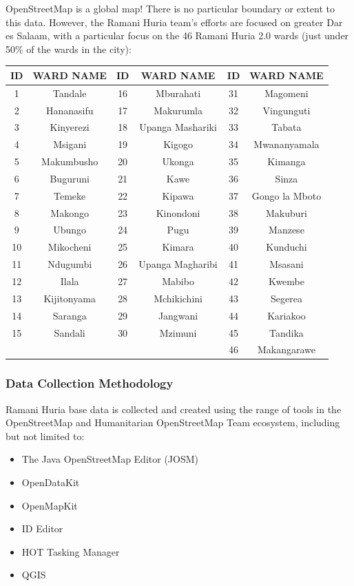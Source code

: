 \documentclass[a4paper,12pt,twoside]{article}
\begin{document}
OpenStreetMap is a global map! There is no particular boundary or extent to this data. However, the Ramani Huria team's efforts are focused on greater Dar es Salaam, with a particular focus on the 46 Ramani Huria 2.0 wards (just under 50\% of the wards in the city):

\begin{center}
\begin{tabular}{|c|c|c|c|c|c|}
\hline
ID & WARD NAME & ID & WARD NAME & ID & WARD NAME\\
\hline
1 & Tandale & 16 & Mburahati & 31 & Magomeni\\
2 & Hananasifu & 17 & Makurumla & 32 & Vingunguti\\
3 & Kinyerezi & 18 & Upanga Mashariki & 33 & Tabata\\
4 & Msigani & 19 & Kigogo & 34 & Mwananyamala\\
5 & Makumbusho & 20 & Ukonga & 35 & Kimanga\\
6 & Buguruni & 21 & Kawe & 36 & Sinza\\
7 & Temeke & 22 & Kipawa & 37 & Gongo la Mboto\\
8 & Makongo & 23 & Kinondoni & 38 & Makuburi\\
9 & Ubungo & 24 & Pugu & 39 & Manzese\\
10 & Mikocheni & 25 & Kimara & 40 & Kunduchi\\
11 & Ndugumbi & 26 & Upanga Magharibi & 41 & Msasani\\
12 & Ilala & 27 & Mabibo & 42 & Kwembe\\
13 & Kijitonyama & 28 & Mchikichini & 43 & Segerea\\
14 & Saranga & 29 & Jangwani & 44 & Kariakoo\\
15 & Sandali & 30 & Mzimuni & 45 & Tandika\\
{} & {} & {} & {} & 46 & Makangarawe\\
 \hline
\end{tabular}
\end{center}

\subsubsection{Data Collection Methodology}
Ramani Huria base data is collected and created using the range of tools in the OpenStreetMap and Humanitarian OpenStreetMap Team ecosystem, including but not limited to:

\begin{itemize}
    \item The Java OpenStreetMap Editor (JOSM)
    \item OpenDataKit
    \item OpenMapKit
    \item ID Editor
    \item HOT Tasking Manager
    \item QGIS
\end{itemize}
\end{document}
